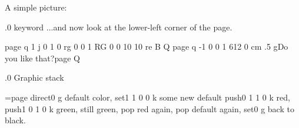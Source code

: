A simple picture:

%

.0 {\cs{} keyword}
...and now look at the lower-left corner of the page.\par
\pdfliteral page {q 1 j 0 1 0 rg 0 0 1 RG 0 0 10 10 re B Q}
\pdfliteral page {q -1 0 0 1 612 0 cm .5 g}\hfill Do you like that?\pdfliteral page {Q}
\endfeature


.0 {Graphic stack}
\def\pdfsetcolor#1{}%


\chardef\Color=\pdfcolorstackinit page direct{0 g}
default color,
\pdfcolorstack\Color set{1 1 0 0 k}
some new default
\pdfcolorstack\Color push{0 1 1 0 k}
red,
\pdfcolorstack\Color push{1 0 1 0 k}
green,
\vfill\eject
still green,
\pdfcolorstack\Color pop
red again,
\pdfcolorstack\Color pop
default again,
\pdfcolorstack\Color set{0 g}
back to black.

